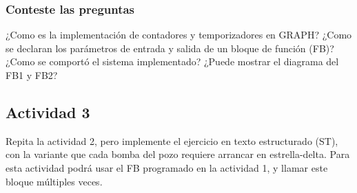 \subsubsection{Conteste las preguntas}

¿Como es la implementación de contadores y temporizadores en GRAPH?
¿Como se declaran los parámetros de entrada  y salida de un bloque de función (FB)?
¿Como se comportó el sistema implementado? ¿Puede mostrar el diagrama del FB1 y FB2?

\subsection{Actividad 3}

Repita la actividad 2, pero implemente el ejercicio en texto estructurado (ST), con la variante que cada bomba del pozo requiere arrancar en estrella-delta.
Para esta actividad podrá usar el FB programado en la actividad 1, y llamar este bloque múltiples veces. 
 

%
% 
% 
% 


